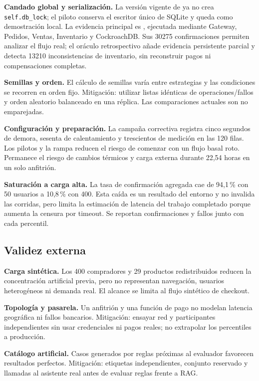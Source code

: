 \documentclass[12pt,a4paper]{article}
\begin{document}
\textbf{Candado global y serialización.} La versión vigente de  ya no crea \texttt{self.db\_lock}; el piloto conserva el escritor único de SQLite y queda como demostración local. La evidencia principal es , ejecutada mediante Gateway, Pedidos, Ventas, Inventario y CockroachDB. Sus 30275 confirmaciones permiten analizar el flujo real; el oráculo retrospectivo añade evidencia persistente parcial y detecta 13210 inconsistencias de inventario, sin reconstruir pagos ni compensaciones completas.

\textbf{Semillas y orden.} El cálculo de semillas varía entre estrategias y las condiciones se recorren en orden fijo. Mitigación: utilizar listas idénticas de operaciones/fallos y orden aleatorio balanceado en una réplica. Las comparaciones actuales son no emparejadas.

\textbf{Configuración y preparación.} La campaña correctiva registra cinco segundos de demora, sesenta de calentamiento y trescientos de medición en las 120 filas. Los pilotos y la rampa reducen el riesgo de comenzar con un flujo basal roto. Permanece el riesgo de cambios térmicos y carga externa durante 22,54 horas en un solo anfitrión.

\textbf{Saturación a carga alta.} La tasa de confirmación agregada cae de 94,1\,\% con 50 usuarios a 10,8\,\% con 400. Esta caída es un resultado del entorno y no invalida las corridas, pero limita la estimación de latencia del trabajo completado porque aumenta la censura por timeout. Se reportan confirmaciones y fallos junto con cada percentil.

\subsection{Validez externa}
\textbf{Carga sintética.} Los 400 compradores y 29 productos redistribuidos reducen la concentración artificial previa, pero no representan navegación, usuarios heterogéneos ni demanda real. El alcance se limita al flujo sintético de checkout.

\textbf{Topología y pasarela.} Un anfitrión y una función de pago no modelan latencia geográfica ni fallos bancarios. Mitigación: ensayar red y participantes independientes sin usar credenciales ni pagos reales; no extrapolar los percentiles a producción.

\textbf{Catálogo artificial.} Casos generados por reglas próximas al evaluador favorecen resultados perfectos. Mitigación: etiquetas independientes, conjunto reservado y llamadas al asistente real antes de evaluar reglas frente a RAG.
\end{document}
